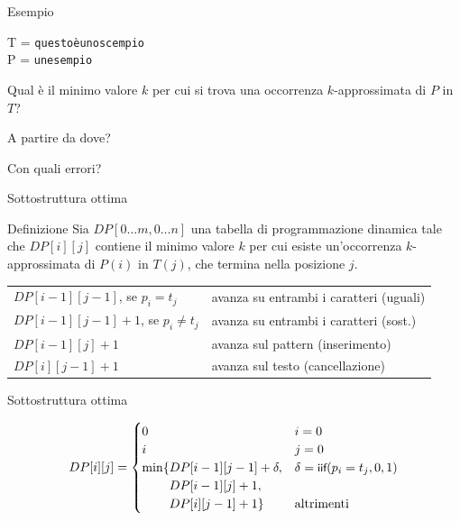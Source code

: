 \begin{frame}{Esempio}

\begin{block}{}
T = \texttt{questoèunoscempio} \\
P = \texttt{unesempio}
\end{block}

\bigskip
{}
\BIL
\item Qual è il minimo valore $k$ per cui si trova una occorrenza $k$-approssimata di $P$ in $T$?
\item A partire da dove?
\item Con quali errori?
\EIL

\end{frame}

\begin{frame}{Sottostruttura ottima}

\vspace{-6pt}
\begin{block}{Definizione}
Sia $DP[0 \ldots m, 0 \ldots n]$ una tabella di programmazione dinamica
tale che $DP[i][j]$ contiene il minimo valore $k$ per cui esiste un'occorrenza $k$-approssimata di $P(i)$ in $T(j)$, che termina nella posizione $j$.
\end{block}

\bigskip
{}
\smallskip
\begin{tabular}{ll}
$DP[i-1][j-1]$, se $p_i = t_j$ &	avanza su entrambi i caratteri (uguali) \\
$DP[i-1][j-1]+1$, se $p_i \neq t_j$ &	avanza su entrambi i caratteri  (\alert{sost.}) \\
$DP[i-1][j]+1$				& avanza sul pattern (\alert{inserimento})\\
$DP[i][j-1]+1$				& avanza sul testo (\alert{cancellazione})\\
\end{tabular}

\end{frame}

\begin{frame}{Sottostruttura ottima}

\vspace{-12pt}
\[
DP[i][j] = \begin{cases}
0  & \textrm{$i=0$}\\
i  & \textrm{$j=0$}\\
\min\{ DP[i-1][j-1] + \delta, & \delta = \textsf{{\small iif}}(p_i=t_j,0,1)\\
\qquad\, DP[i-1][j] + 1,\\ 
\qquad\, DP[i][j-1] + 1\} & \textrm{altrimenti}
\end{cases}
\]

\bigskip
\begin{center}
\end{center}

\end{frame}

